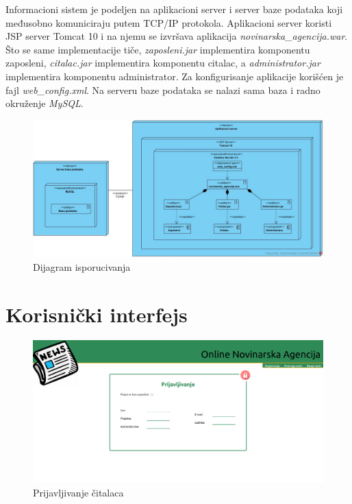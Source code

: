 \documentclass{article}
\begin{document}
\newpage

\newpage

Informacioni sistem je podeljen na aplikacioni server i server baze podataka koji međusobno komuniciraju putem TCP/IP protokola. Aplikacioni server koristi JSP server Tomcat 10 i na njemu se izvršava aplikacija \textit{novinarska\_agencija.war}.
Što se same implementacije tiče, \textit{zaposleni.jar} implementira komponentu zaposleni, \textit{citalac.jar} implementira komponentu citalac, a \textit{administrator.jar} implementira komponentu administrator. Za konfigurisanje aplikacije korišćen je fajl
\textit{web\_config.xml}. Na serveru baze podataka se nalazi sama baza i radno okruženje \textit{MySQL}. 

\begin{figure}[htbp!]
    \centering
    \includegraphics[scale=0.33]{Dijagram_isporucivanja.jpg}
    \caption{Dijagram isporucivanja}
    \label{slk:dtp}
\end{figure}


\newpage
\section{Korisnički interfejs}

\begin{figure}[htbp!]
    \centering
    \includegraphics[scale=0.20]{PrijavaCitalaca.png}
    \caption{Prijavljivanje čitalaca}
    \label{slk:dtp}
\end{figure}
\end{document}
